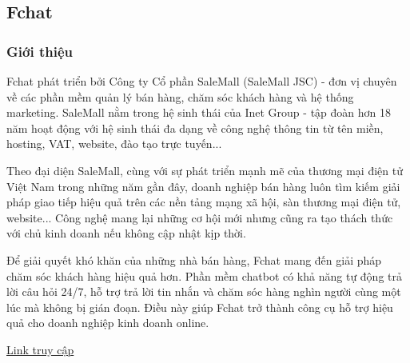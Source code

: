 \subsection{Fchat}
\subsubsection{Giới thiệu}
Fchat phát triển bởi Công ty Cổ phần SaleMall (SaleMall JSC) - đơn vị chuyên về các phần mềm quản lý bán hàng, chăm sóc khách hàng và hệ thống marketing. SaleMall nằm trong hệ sinh thái của Inet Group - tập đoàn hơn 18 năm hoạt động với hệ sinh thái đa dạng về công nghệ thông tin từ tên miền, hosting, VAT, website, đào tạo trực tuyến...

Theo đại diện SaleMall, cùng với sự phát triển mạnh mẽ của thương mại điện tử Việt Nam trong những năm gần đây, doanh nghiệp bán hàng luôn tìm kiếm giải pháp giao tiếp hiệu quả trên các nền tảng mạng xã hội, sàn thương mại điện tử, website... Công nghệ mang lại những cơ hội mới nhưng cũng ra tạo thách thức với chủ kinh doanh nếu không cập nhật kịp thời.

Để giải quyết khó khăn của những nhà bán hàng, Fchat mang đến giải pháp chăm sóc khách hàng hiệu quả hơn. Phần mềm chatbot có khả năng tự động trả lời câu hỏi 24/7, hỗ trợ trả lời tin nhắn và chăm sóc hàng nghìn người cùng một lúc mà không bị gián đoạn. Điều này giúp Fchat trở thành công cụ hỗ trợ hiệu quả cho doanh nghiệp kinh doanh online.

\href{https://fchat.vn/}{Link truy cập}
